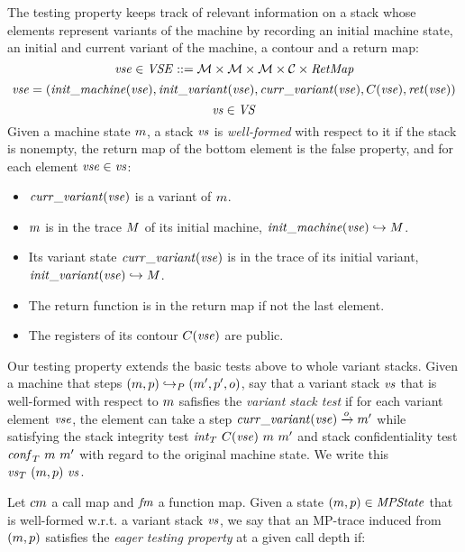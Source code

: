 \documentclass[acmsmall,review,anonymous]{acmart}\settopmatter{printfolios=true,printccs=false,printacmref=false}
\begin{document}
  The testing property keeps track of relevant information on a stack whose
  elements represent variants of the machine by recording an initial machine
  state, an initial and current variant of the machine, a contour and a return
  map:
%
  $$\mathit{vse} \in \mathit{VSE} ::= {\mathcal M} \times {\mathcal M} \times {\mathcal M} \times {\mathcal C} \times \mathit{RetMap}$$
  $$\mathit{vse} = (\mathit{init\_machine}(\mathit{vse}), \mathit{init\_variant}(\mathit{vse}), \mathit{curr\_variant}(\mathit{vse}), C(\mathit{vse}), \mathit{ret}(\mathit{vse}))$$
  $$\mathit{vs} \in \mathit{VS}$$
%
  Given a machine state $m$, a stack $\mathit{vs}$ is \emph{well-formed} with
  respect to it if the stack is nonempty, the return map of the bottom element
  is the false property, and for each element $\mathit{vse} \in \mathit{vs}$:
  \begin{itemize}
  \item $\mathit{curr\_variant}(\mathit{vse})$ is a variant of $m$.
  \item $m$ is in the trace $M$ of its initial machine,
    $\mathit{init\_machine}(\mathit{vse}) \hookrightarrow M$.
  \item Its variant state $\mathit{curr\_variant}(\mathit{vse})$
    is in the trace of its initial variant,
    $\mathit{init\_variant}(\mathit{vse}) \hookrightarrow M$.
  \item The return function is in the return map if not the last element. 
  \item The registers of its contour $C(\mathit{vse})$ are public.
  \end{itemize}

%
  Our testing property extends the basic tests above to whole variant stacks.
  Given a machine that steps $(m, p) \hookrightarrow_P (m', p',
  o)$, say that a variant stack $\mathit{vs}$ that is well-formed with respect to
  $m$ safisfies the \emph{variant stack test} if for each variant element
  $\mathit{vse}$, the element can take a step $\mathit{curr\_variant}(\mathit{vse})
  \xrightarrow{o} m'$ while satisfying the stack integrity test
  $\mathit{int}_T ~ C(\mathit{vse}) ~ m ~ m'$ and stack confidentiality
  test $\mathit{conf}_T ~ m ~ m'$ with regard to the original machine
  state. We write this $\mathit{\mathit{vs}}_T ~ (m, p) ~ \mathit{vs}$.

  Let $cm$ a call map and $\mathit{fm}$ a function map. Given a state
  $(m, p) \in \mathit{MPState}$ that is well-formed w.r.t. a variant stack $\mathit{vs}$, we
  say that an MP-trace induced from $(m, p)$ satisfies the \emph{eager
  testing property} at a given call depth if:
\end{document}

